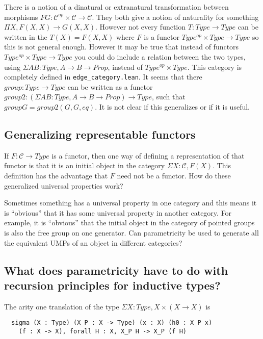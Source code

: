 \documentclass[12pt]{article} %
\theoremstyle{definition}
\theoremstyle{definition}
\theoremstyle{definition}
\theoremstyle{definition}
\begin{document}
There is a notion of a dinatural or extranatural transformation between morphisms 
$F G : \mathcal{C}^{op} \times \mathcal{C} \rightarrow \mathcal{C}$. They both give 
a notion of naturality for something $\Pi X, F(X, X) \rightarrow G(X,X)$. However not
every function $T : Type \rightarrow Type$ can be written in the $T(X) = F(X, X)$ where 
$F$ is a functor $Type^{op} \times Type \rightarrow Type$ so this is not general enough. 
However it may be true that instead of functors $Type^{op} \times Type \rightarrow Type$
you could do include a relation between the two types, using $\Sigma A B : Type, A \rightarrow B \rightarrow Prop$,
instead of $Type^{op} \times Type$. This category is completely defined in \lstinline{edge_category.lean}.
It seems that there $group : Type \rightarrow Type$ can be written as a functor
$group2 : (\Sigma A B : Type, A \rightarrow B \rightarrow Prop) \rightarrow Type$, such that 
$group G = group2(G, G, eq)$. It is not clear if this generalizes or if it is useful.

\subsection{Generalizing representable functors}
If $F : \mathcal{C} \rightarrow Type$ is a functor, then one way of defining a representation
of that functor is that it is an initial object in the category $\Sigma X : \mathcal{C}, F(X)$.
This definition has the advantage that $F$ need not be a functor. How do these generalized 
universal properties work?

Sometimes something has a universal property in one category and this means it is ``obvious'' that 
it has some universal property in another category. For example, it is ``obvious'' that the initial
object in the category of pointed groups is also the free group on one generator. Can parametricity be used 
to generate all the equivalent UMPs of an object in different categories?

\subsection {What does parametricity have to do with recursion principles for inductive types?}

The arity one translation of the type $\Sigma X : Type, X \times (X \rightarrow X)$ is 
\begin{lstlisting}
  sigma (X : Type) (X_P : X -> Type) (x : X) (h0 : X_P x) 
    (f : X -> X), forall H : X, X_P H -> X_P (f H)
\end{lstlisting}






\end{document}
